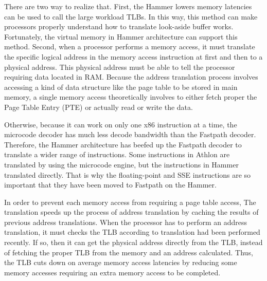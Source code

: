 \documentclass[letterpaper,10pt,compsoc,draftclsnofoot,onecolumn]{IEEEtran}
\begin{document}
There are two way to realize that. First, the Hammer lowers memory latencies can be used to call the large workload TLBs. In this way, this method can make processors properly understand how to translate look-aside buffer works. Fortunately, the virtual memory in Hammer architecture can support this method. Second, when a processor performs a memory access, it must translate the specific logical address in the memory access instruction at first and then to a physical address\cite{pdf_amd_mem}. This physical address must be able to tell the processor requiring data located in RAM. Because the address translation process involves accessing a kind of data structure like the page table to be stored in main memory, a single memory access theoretically involves to either fetch proper the Page Table Entry (PTE) or actually read or write the data\cite{pdf_amd_mem}.

Otherwise, because it can work on only one x86 instruction at a time, the microcode decoder has much less decode bandwidth than the Fastpath decoder. Therefore, the Hammer architecture has beefed up the Fastpath decoder to translate a wider range of instructions. Some instructions  in Athlon are translated by using the microcode engine, but the instructions in Hammer translated directly. That is why the floating-point and SSE instructions are so important that they have been moved to Fastpath on the Hammer.

In order to prevent each memory access from requiring a page table access, The translation speeds up the process of address translation by caching the results of previous address translations. When the processor has to perform an address translation, it must checks the TLB according to translation had been performed recently. If so, then it can get the physical address directly from the TLB, instead of fetching the proper TLB from the memory and an address calculated. Thus, the TLB cuts down on average memory access latencies by reducing some memory accesses requiring an extra memory access to be completed.
\end{document}
